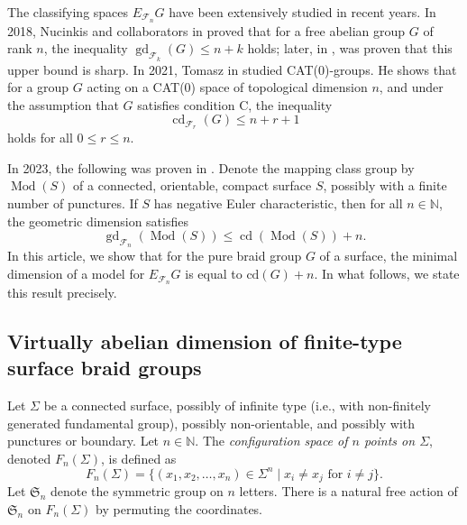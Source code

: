 \documentclass[a4paper,12pt,leqno]{amsart}
\theoremstyle{definition}
\newcommand{\calF}{{\mathcal F}}
\DeclareMathOperator{\cd}{cd}
\DeclareMathOperator{\gd}{gd}
\DeclareMathOperator{\mcg}{Mod}
\begin{document}
The classifying spaces \( E_{\calF_n}G \) have been extensively studied in recent years. In 2018, Nucinkis and collaborators in \cite{victor:nucinkis:corob} proved that for a free abelian group \( G \) of rank \( n \), the inequality \( \gd_{\calF_k}(G) \leq n + k \) holds; later, in \cite{PL}, was proven that this upper bound is sharp. 
In 2021, Tomasz in \cite{tomasz} studied  CAT(0)-groups. He shows that for a group \( G \) acting on a CAT(0) space of topological dimension \( n \), and under the assumption that \( G \) satisfies condition C, the inequality
\[
\cd_{\calF_r}(G) \leq n + r + 1
\]
holds for all \( 0 \leq r \leq n \).

In 2023, the following was proven in \cite{Rita:Porfirio:Luis}. Denote the mapping class group by \( \mcg(S) \) of a connected, orientable, compact surface \( S \), possibly with a finite number of punctures. If \( S \) has negative Euler characteristic, then for all \( n \in \mathbb{N} \), the geometric dimension satisfies
\[
\gd_{\calF_n}(\mcg(S)) \leq \cd(\mcg(S)) + n.
\]
In this article, we show that for the pure braid group $G$ of a surface, the minimal dimension of a model for \(E_{\mathcal{F}_n}G\) is equal to \(\mathrm{cd}(G) + n\).  In what follows, we state this result precisely. 

\subsection*{Virtually abelian dimension of finite-type surface braid groups}

Let \( \Sigma \) be a connected surface, possibly of infinite type (i.e., with non-finitely generated fundamental group), possibly non-orientable, and possibly with punctures or boundary. 
Let \( n \in \mathbb{N} \). 
The \emph{configuration space of \( n \) points on \( \Sigma \)}, denoted \( F_n(\Sigma) \), is defined as
\[
F_n(\Sigma) = \{ (x_1, x_2, \ldots, x_n) \in \Sigma^n \mid x_i \neq x_j \text{ for } i \neq j \}.
\]
Let \( \mathfrak{S}_n \) denote the symmetric group on \( n \) letters. There is a natural free action of \( \mathfrak{S}_n \) on \( F_n(\Sigma) \) by permuting the coordinates. 
\end{document}
